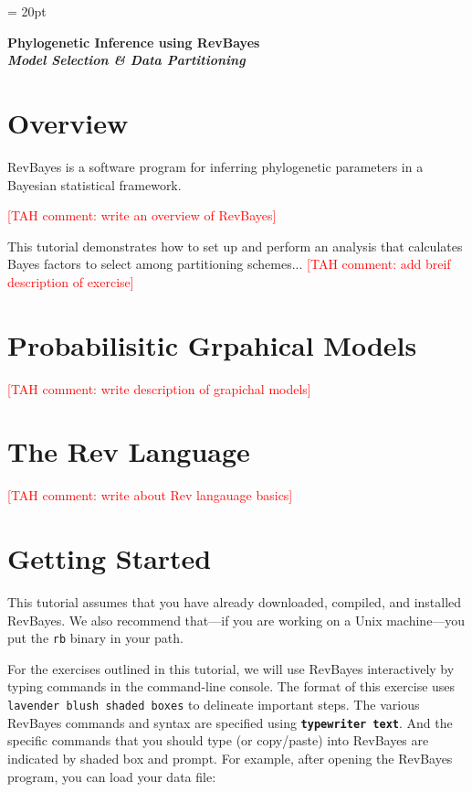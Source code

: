 \documentclass[11pt]{article}
\newcommand{\taha}[1]{{\textcolor{red}{[TAH comment: #1]}}} %
\newcommand{\cl}[1]{{\texttt{\textbf{#1}}}}
\begin{document}
\renewcommand{\headrulewidth}{0.5pt}
\headsep = 20pt
\lhead{ }

\thispagestyle{plain}
\begin{center}

\textbf{\LARGE Phylogenetic Inference using RevBayes}\\\vspace{2mm}
\textbf{\it{\Large Model Selection \& Data Partitioning}}\\\vspace{2mm}
\end{center}

\section*{Overview}

RevBayes is a software program for inferring phylogenetic parameters in a Bayesian statistical framework. 
 
\taha{write an overview of RevBayes}

This tutorial demonstrates how to set up and perform an analysis that calculates Bayes factors to select among partitioning schemes...
\taha{add breif description of exercise}


\bigskip
\section*{Probabilisitic Grpahical Models}
\taha{write description of grapichal models}

\bigskip
\section*{The Rev Language}
\taha{write about Rev langauage basics}

\bigskip
\section*{Getting Started}

This tutorial assumes that you have already downloaded, compiled, and installed RevBayes. 
We also recommend that---if you are working on a Unix machine---you put the {\tt rb} binary in your path.

For the exercises outlined in this tutorial, we will use RevBayes interactively by typing commands in the command-line console.
The format of this exercise uses \colorbox{shadecolor}{\tt lavender blush shaded boxes} to delineate important steps. 
The various RevBayes commands and syntax are specified using \cl{typewriter text}. And the specific commands that you should type (or copy/paste) into RevBayes are indicated by shaded box and prompt. For example, after opening the RevBayes program, you can load your data file:
\end{document}

